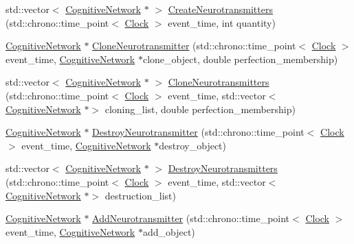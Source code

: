 \begin{DoxyCompactItemize}
\item 
std\+::vector$<$ \hyperlink{class_cognitive_network}{Cognitive\+Network} $\ast$ $>$ \hyperlink{class_interneuron_space_af69f7190226d77a30a80d66d7c28e0ba}{Create\+Neurotransmitters} (std\+::chrono\+::time\+\_\+point$<$ \hyperlink{universe_8h_a0ef8d951d1ca5ab3cfaf7ab4c7a6fd80}{Clock} $>$ event\+\_\+time, int quantity)
\item 
\hyperlink{class_cognitive_network}{Cognitive\+Network} $\ast$ \hyperlink{class_interneuron_space_a96149bba4c6efd03586700a6fe86960a}{Clone\+Neurotransmitter} (std\+::chrono\+::time\+\_\+point$<$ \hyperlink{universe_8h_a0ef8d951d1ca5ab3cfaf7ab4c7a6fd80}{Clock} $>$ event\+\_\+time, \hyperlink{class_cognitive_network}{Cognitive\+Network} $\ast$clone\+\_\+object, double perfection\+\_\+membership)
\item 
std\+::vector$<$ \hyperlink{class_cognitive_network}{Cognitive\+Network} $\ast$ $>$ \hyperlink{class_interneuron_space_a3defddf17eb839dbd799980f6116f895}{Clone\+Neurotransmitters} (std\+::chrono\+::time\+\_\+point$<$ \hyperlink{universe_8h_a0ef8d951d1ca5ab3cfaf7ab4c7a6fd80}{Clock} $>$ event\+\_\+time, std\+::vector$<$ \hyperlink{class_cognitive_network}{Cognitive\+Network} $\ast$$>$ cloning\+\_\+list, double perfection\+\_\+membership)
\item 
\hyperlink{class_cognitive_network}{Cognitive\+Network} $\ast$ \hyperlink{class_interneuron_space_a41eb332165b0a67c3549bd73a8faa969}{Destroy\+Neurotransmitter} (std\+::chrono\+::time\+\_\+point$<$ \hyperlink{universe_8h_a0ef8d951d1ca5ab3cfaf7ab4c7a6fd80}{Clock} $>$ event\+\_\+time, \hyperlink{class_cognitive_network}{Cognitive\+Network} $\ast$destroy\+\_\+object)
\item 
std\+::vector$<$ \hyperlink{class_cognitive_network}{Cognitive\+Network} $\ast$ $>$ \hyperlink{class_interneuron_space_a9543932ffea18cce46fdfbf0fbb85b1b}{Destroy\+Neurotransmitters} (std\+::chrono\+::time\+\_\+point$<$ \hyperlink{universe_8h_a0ef8d951d1ca5ab3cfaf7ab4c7a6fd80}{Clock} $>$ event\+\_\+time, std\+::vector$<$ \hyperlink{class_cognitive_network}{Cognitive\+Network} $\ast$$>$ destruction\+\_\+list)
\item 
\hyperlink{class_cognitive_network}{Cognitive\+Network} $\ast$ \hyperlink{class_interneuron_space_afee7374310b2a8c08bac232d62ea7aa1}{Add\+Neurotransmitter} (std\+::chrono\+::time\+\_\+point$<$ \hyperlink{universe_8h_a0ef8d951d1ca5ab3cfaf7ab4c7a6fd80}{Clock} $>$ event\+\_\+time, \hyperlink{class_cognitive_network}{Cognitive\+Network} $\ast$add\+\_\+object)
\item 

\end{DoxyCompactItemize}
